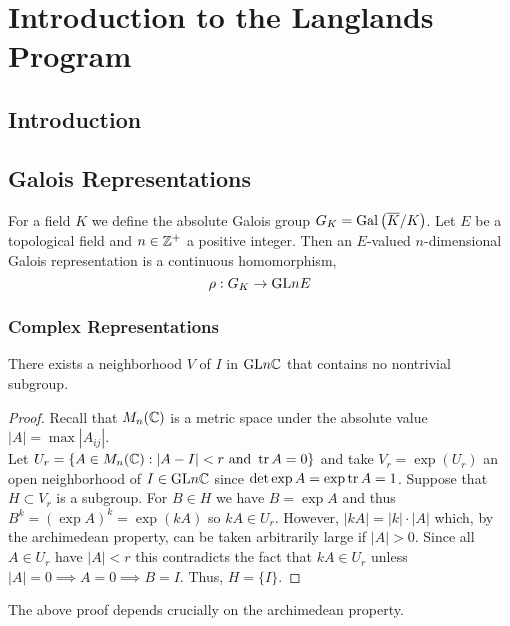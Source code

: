 \documentclass[12pt]{article}
\begin{document}
\section{Introduction to the Langlands Program}

\subsection{Introduction}

\subsection{Galois Representations}

\begin{defn}
For a field $K$ we define the absolute Galois group $G_K = \mathrm{Gal}\left( \overline{K} / K \right)$. Let $E$ be a topological field and $n \in \mathbb{Z}^{+}$ a positive integer. Then an $E$-valued $n$-dimensional Galois representation is a continuous homomorphism,
\[ \rho : G_K \to \mathrm{GL}{n}{E} \]
\end{defn}

\subsubsection{Complex Representations}

\begin{lemma} \label{lem:no_subgroups_of_nbd}
There exists a neighborhood $V$ of $I$ in $\mathrm{GL}{n}{\mathbb{C}}$ that contains no nontrivial subgroup.
\end{lemma}
\begin{proof}
Recall that $M_n(\mathbb{C})$ is a metric space under the absolute value $|A| = \max |A_{ij}|$.
\\
Let $U_r = \{A \in M_n(\mathbb{C}) : |A - I| < r \text{ and } \operatorname{\mathrm{tr}}{A} = 0 \}$ and take $V_r = \exp(U_r)$ an open neighborhood of $I \in \mathrm{GL}{n}{\mathbb{C}}$ since $\det{\exp{A}} = \exp{\operatorname{\mathrm{tr}}{A}} = 1$. Suppose that $H \subset V_r$ is a subgroup. For $B \in H$ we have $B = \exp{A}$ and thus $B^k = (\exp{A})^k = \exp{(kA)}$ so $kA \in U_r$. However, $|k A| = |k| \cdot |A|$ which, by the archimedean property, can be taken arbitrarily large if $|A| > 0$. Since all $A \in U_r$ have $|A| < r$ this contradicts the fact that $k A \in U_r$ unless $|A| = 0 \implies A = 0 \implies B = I$. Thus, $H = \{ I \}$.  
\end{proof}

\begin{remark}
The above proof depends crucially on the archimedean property. 
\end{remark}
\end{document}
